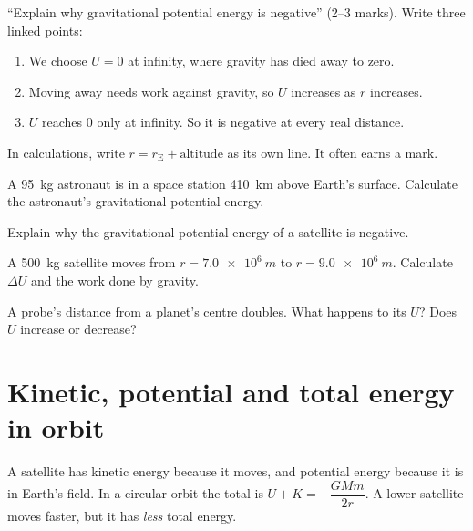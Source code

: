 \begin{examtip}
``Explain why gravitational potential energy is negative'' (2--3 marks). Write
three linked points:
\begin{enumerate}
  \item We choose $U = 0$ at infinity, where gravity has died away to zero.
  \item Moving away needs work against gravity, so $U$ increases as $r$ increases.
  \item $U$ reaches 0 only at infinity. So it is negative at every real distance.
\end{enumerate}
In calculations, write $r = r_\mathrm{E} + \text{altitude}$ as its own line. It
often earns a mark.
\end{examtip}

\begin{quickcheck}
  \item A \qty{95}{kg} astronaut is in a space station \qty{410}{km} above Earth's
        surface. Calculate the astronaut's gravitational potential energy.
  \item Explain why the gravitational potential energy of a satellite is
        negative.\label{ch5:qc:negative}
  \item A \qty{500}{kg} satellite moves from $r = \qty{7.0e6}{m}$ to
        $r = \qty{9.0e6}{m}$. Calculate $\Delta U$ and the work done by gravity.
  \item A probe's distance from a planet's centre doubles. What happens to its
        $U$? Does $U$ increase or decrease?
\end{quickcheck}

\section{Kinetic, potential and total energy in orbit}\label{ch5:sec:orbit}

\begin{bigidea}
A satellite has kinetic energy because it moves, and potential energy because it
is in Earth's field. In a circular orbit the total is $U + K = -\dfrac{GMm}{2r}$.
A lower satellite moves faster, but it has \emph{less} total energy.
\end{bigidea}

\begin{keywords}
\end{keywords}

